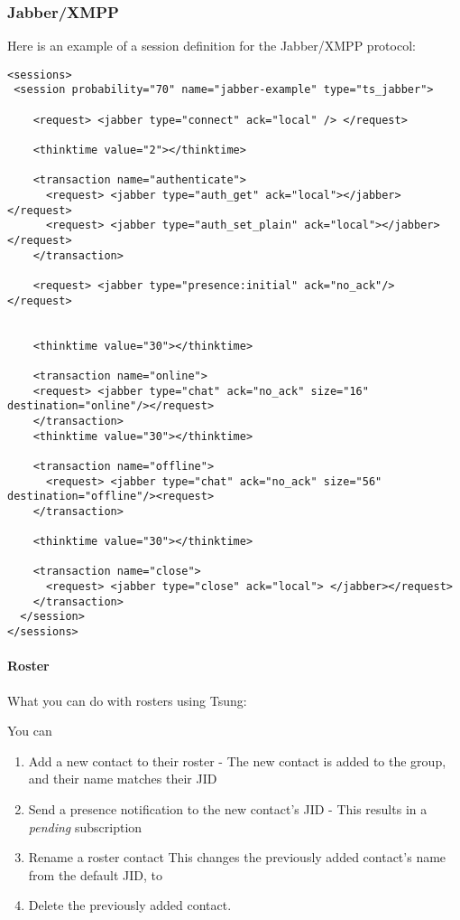 \documentclass{TSUNG-en}
\begin{document}
\subsubsection{Jabber/XMPP}

\label{sec:sessions:jabber}
\par Here is an example of a session definition for the Jabber/XMPP protocol:
\begin{Verbatim}
<sessions>
 <session probability="70" name="jabber-example" type="ts_jabber">

    <request> <jabber type="connect" ack="local" /> </request>

    <thinktime value="2"></thinktime>

    <transaction name="authenticate">
      <request> <jabber type="auth_get" ack="local"></jabber> </request>
      <request> <jabber type="auth_set_plain" ack="local"></jabber> </request>
    </transaction>

    <request> <jabber type="presence:initial" ack="no_ack"/> </request>


    <thinktime value="30"></thinktime>

    <transaction name="online">
    <request> <jabber type="chat" ack="no_ack" size="16" destination="online"/></request>
    </transaction>
    <thinktime value="30"></thinktime>

    <transaction name="offline">
      <request> <jabber type="chat" ack="no_ack" size="56" destination="offline"/><request>
    </transaction>

    <thinktime value="30"></thinktime>

    <transaction name="close">
      <request> <jabber type="close" ack="local"> </jabber></request>
    </transaction>
  </session>
</sessions>
\end{Verbatim}

\paragraph{Roster}

What you can do with rosters using Tsung:

You can
\begin{enumerate}
\item  Add a new contact to their roster
   - The new contact is added to the  group, and their name matches their JID
\item  Send a  presence notification to the new contact's JID
   - This results in a \emph{pending} subscription
 \item  Rename a roster contact
    This changes the previously added contact's name from the default JID, to 
  \item Delete the previously added contact.
\end{enumerate}
\end{document}
